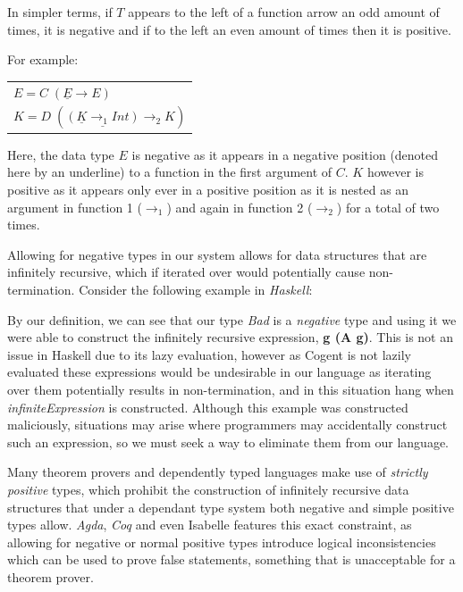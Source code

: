 In simpler terms, if $T$ appears to the left of a function arrow an odd amount of times, it is negative and if
to the left an even amount of times then it is positive.

For example:

\begin{center}
    \begin{tabular}{l}
        $E = C\; (\underline{E} \rightarrow E)$ \\
        $K = D\; (\underline{(\underline{K} \rightarrow_1 Int)} \rightarrow_2 K)$
    \end{tabular} 
\end{center}

Here, the data type $E$ is negative as it appears in a negative position (denoted here by an underline)
to a function in the first argument of $C$.
$K$ however is positive as it appears only ever in a positive position as it is nested as an argument
in function 1 ($\rightarrow_1$) and again in function 2 ($\rightarrow_2$) for a total of two times.

Allowing for negative types in our system allows for data structures that are infinitely recursive,
which if iterated over would potentially cause non-termination. Consider
the following example in \textit{Haskell}:


By our definition, we can see that our type \textit{Bad} is a \textit{negative} type and using it we were able
to construct the infinitely recursive expression, \textbf{g (A g)}.
This is not an issue in Haskell due to its lazy evaluation,
however as Cogent is not lazily evaluated these expressions would be undesirable in
our language as iterating over them potentially results in non-termination, and in this
situation  hang when \textit{infiniteExpression} is constructed.
Although this example was constructed maliciously, situations may arise where
programmers may accidentally construct such an expression, so we must seek a way to
eliminate them from our language.

Many theorem provers and dependently typed languages make use of \textit{strictly positive} types, which
prohibit the construction of infinitely recursive data structures\liam{,} that under a dependant type system
both negative and simple positive types allow.
\textit{Agda}\citep{AgdaStrictlyPositive}, \textit{Coq}\citep{CoqStrictlyPositive} and even
Isabelle\citep{IsabelleStrictlyPositive} features this exact constraint, as allowing for negative
or normal positive types introduce logical inconsistencies which can be used to prove false statements,
something that is unacceptable for a theorem prover.

